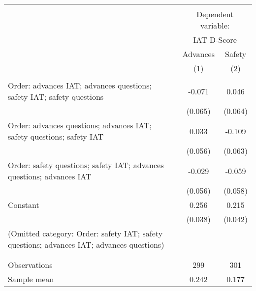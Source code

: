 \begin{tabular}{l*{2}{c}} \hline\hline \\[-1.8ex] & \multicolumn{2}{c}{Dependent variable:} \\ & \multicolumn{2}{c}{IAT D-Score} \\ & Advances & Safety \\
                    &\multicolumn{1}{c}{(1)}         &\multicolumn{1}{c}{(2)}         \\
\hline \\[-1.8ex]
Order: advances IAT; advances questions; safety IAT; safety questions&      -0.071         &       0.046         \\
                    &     (0.065)         &     (0.064)         \\
[1em]
Order: advances questions; advances IAT; safety questions; safety IAT&       0.033         &      -0.109\sym{*}  \\
                    &     (0.056)         &     (0.063)         \\
[1em]
Order: safety questions; safety IAT; advances questions; advances IAT&      -0.029         &      -0.059         \\
                    &     (0.056)         &     (0.058)         \\
[1em]
Constant            &       0.256\sym{***}&       0.215\sym{***}\\
                    &     (0.038)         &     (0.042)         \\
(Omitted category: Order: safety IAT; safety questions; advances IAT; advances questions) & & \\ \\[-1.8ex] \hline \\[-1.8ex]
Observations        &         299         &         301         \\
Sample mean         &       0.242         &       0.177         \\
\hline\hline \end{tabular}
